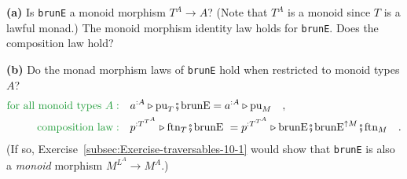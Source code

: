 \textbf{(a)} Is \lstinline!brunE! a monoid morphism $T^{A}\rightarrow A$?
(Note that $T^{A}$ is a monoid since $T$ is a lawful monad.) The
monoid morphism identity law holds for \lstinline!brunE!. Does the
composition law hold?

\textbf{(b)} Do the monad morphism laws of \lstinline!brunE! hold
when restricted to monoid types $A$?
\begin{align*}
{\color{greenunder}\text{for all monoid types }A:}\quad & a^{:A}\triangleright\text{pu}_{T}\bef\text{brunE}=a^{:A}\triangleright\text{pu}_{M}\quad,\\
{\color{greenunder}\text{composition law}:}\quad & p^{:T^{T^{A}}}\triangleright\text{ftn}_{T}\bef\text{brunE }=p^{:T^{T^{A}}}\triangleright\text{brunE}\bef\text{brunE}^{\uparrow M}\bef\text{ftn}_{M}\quad.
\end{align*}
(If so, Exercise~\ref{subsec:Exercise-traversables-10-1} would show
that \lstinline!brunE! is also a \emph{monoid} morphism $M^{L^{A}}\rightarrow M^{A}$.)
